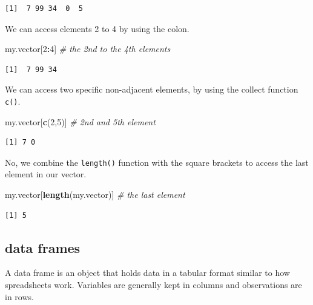 \documentclass[]{book}
\newenvironment{Shaded}{\begin{snugshade}}{\end{snugshade}}
\newcommand{\KeywordTok}[1]{\textcolor[rgb]{0.13,0.29,0.53}{\textbf{#1}}}
\newcommand{\DecValTok}[1]{\textcolor[rgb]{0.00,0.00,0.81}{#1}}
\newcommand{\CommentTok}[1]{\textcolor[rgb]{0.56,0.35,0.01}{\textit{#1}}}
\newcommand{\OperatorTok}[1]{\textcolor[rgb]{0.81,0.36,0.00}{\textbf{#1}}}
\newcommand{\NormalTok}[1]{#1}
\theoremstyle{definition}
\theoremstyle{definition}
\theoremstyle{definition}
\theoremstyle{remark}
\begin{document}
\begin{verbatim}
[1]  7 99 34  0  5
\end{verbatim}

We can access elements 2 to 4 by using the colon.

\begin{Shaded}
\begin{Highlighting}[]
\NormalTok{my.vector[}\DecValTok{2}\OperatorTok{:}\DecValTok{4}\NormalTok{] }\CommentTok{# the 2nd to the 4th elements}
\end{Highlighting}
\end{Shaded}

\begin{verbatim}
[1]  7 99 34
\end{verbatim}

We can access two specific non-adjacent elements, by using the collect
function \texttt{c()}.

\begin{Shaded}
\begin{Highlighting}[]
\NormalTok{my.vector[}\KeywordTok{c}\NormalTok{(}\DecValTok{2}\NormalTok{,}\DecValTok{5}\NormalTok{)] }\CommentTok{# 2nd and 5th element}
\end{Highlighting}
\end{Shaded}

\begin{verbatim}
[1] 7 0
\end{verbatim}

No, we combine the \texttt{length()} function with the square brackets
to access the last element in our vector.

\begin{Shaded}
\begin{Highlighting}[]
\NormalTok{my.vector[}\KeywordTok{length}\NormalTok{(my.vector)] }\CommentTok{# the last element}
\end{Highlighting}
\end{Shaded}

\begin{verbatim}
[1] 5
\end{verbatim}

\subsection{data frames}\label{data-frames}

A data frame is an object that holds data in a tabular format similar to
how spreadsheets work. Variables are generally kept in columns and
observations are in rows.
\end{document}
